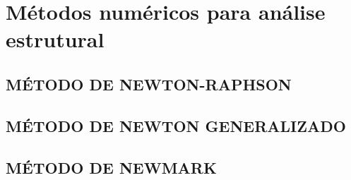 \chapter{Métodos numéricos para análise estrutural}


\section{MÉTODO DE NEWTON-RAPHSON} \label{Sec:Metodonewtonraphson}

\section{MÉTODO DE NEWTON GENERALIZADO} \label{Sec:Metodonewtongeneral}

\section{MÉTODO DE NEWMARK} \label{Sec:Metodonewmark}

